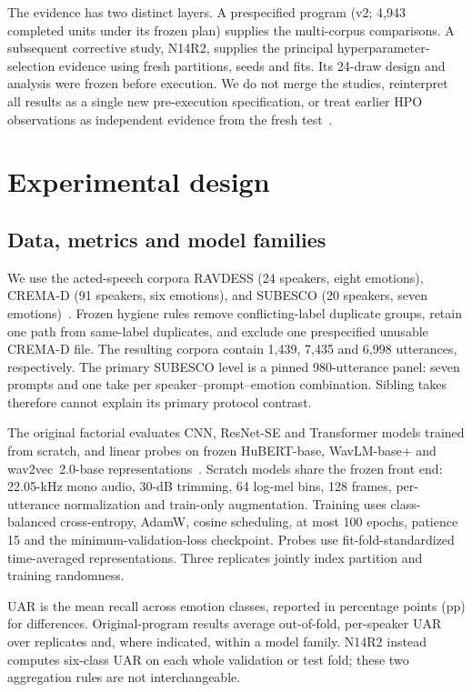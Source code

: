 \documentclass[letterpaper]{article}
\begin{document}
The evidence has two distinct layers. A prespecified program (v2; 4,943 completed units under its frozen plan) supplies the multi-corpus comparisons. A subsequent corrective study, N14R2, supplies the principal hyperparameter-selection evidence using fresh partitions, seeds and fits. Its 24-draw design and analysis were frozen before execution. We do not merge the studies, reinterpret all results as a single new pre-execution specification, or treat earlier HPO observations as independent evidence from the fresh test~\cite{artifact}.

\section{Experimental design}
\subsection{Data, metrics and model families}
We use the acted-speech corpora RAVDESS (24 speakers, eight emotions), CREMA-D (91 speakers, six emotions), and SUBESCO (20 speakers, seven emotions)~\cite{ravdess,cremad,subesco}. Frozen hygiene rules remove conflicting-label duplicate groups, retain one path from same-label duplicates, and exclude one prespecified unusable CREMA-D file. The resulting corpora contain 1,439, 7,435 and 6,998 utterances, respectively. The primary SUBESCO level is a pinned 980-utterance panel: seven prompts and one take per speaker--prompt--emotion combination. Sibling takes therefore cannot explain its primary protocol contrast.

The original factorial evaluates CNN, ResNet-SE and Transformer models trained from scratch, and linear probes on frozen HuBERT-base, WavLM-base+ and wav2vec~2.0-base representations~\cite{hubert,wavlm,wav2vec}. Scratch models share the frozen front end: 22.05-kHz mono audio, 30-dB trimming, 64 log-mel bins, 128 frames, per-utterance normalization and train-only augmentation. Training uses class-balanced cross-entropy, AdamW, cosine scheduling, at most 100 epochs, patience 15 and the minimum-validation-loss checkpoint. Probes use fit-fold-standardized time-averaged representations. Three replicates jointly index partition and training randomness.

UAR is the mean recall across emotion classes, reported in percentage points (pp) for differences. Original-program results average out-of-fold, per-speaker UAR over replicates and, where indicated, within a model family. N14R2 instead computes six-class UAR on each whole validation or test fold; these two aggregation rules are not interchangeable.
\end{document}
